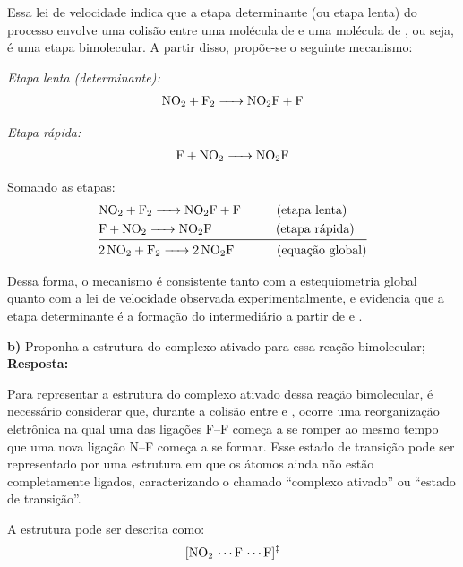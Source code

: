 Essa lei de velocidade indica que a etapa determinante (ou etapa lenta) do processo envolve uma colisão entre uma molécula de  e uma molécula de , ou seja, é uma etapa bimolecular. A partir disso, propõe-se o seguinte mecanismo:

\textit{Etapa lenta (determinante):}
\begin{align*}
\ce{NO2 + F2 -> NO2F + F}
\end{align*}

\textit{Etapa rápida:}
\begin{align*}
\ce{F + NO2 -> NO2F}
\end{align*}

Somando as etapas:
\begin{align*}
&\ce{NO2 + F2 -> NO2F + F} \hspace{1.0cm} \text{(etapa lenta)}\\
&\ce{F + NO2 -> NO2F} \hspace{1.8cm} \text{(etapa rápida)}\\
\midrule %
&\ce{2NO2 + F2 -> 2NO2F} \hspace{1.2cm} \text{(equação global)}
\end{align*}

Dessa forma, o mecanismo é consistente tanto com a estequiometria global quanto com a lei de velocidade observada experimentalmente, e evidencia que a etapa determinante é a formação do intermediário a partir de  e .

\vspace{0.4cm}

\textbf{b)} Proponha a estrutura do complexo ativado para essa reação bimolecular;\\

\textbf{Resposta:} 

Para representar a estrutura do complexo ativado dessa reação bimolecular, é necessário considerar que, durante a colisão entre  e , ocorre uma reorganização eletrônica na qual uma das ligações F–F começa a se romper ao mesmo tempo que uma nova ligação N–F começa a se formar. Esse estado de transição pode ser representado por uma estrutura em que os átomos ainda não estão completamente ligados, caracterizando o chamado “complexo ativado” ou “estado de transição”.

A estrutura pode ser descrita como:
\begin{align*}
\ce{[NO2 \cdots F \cdots F]^{\ddagger}}
\end{align*}

